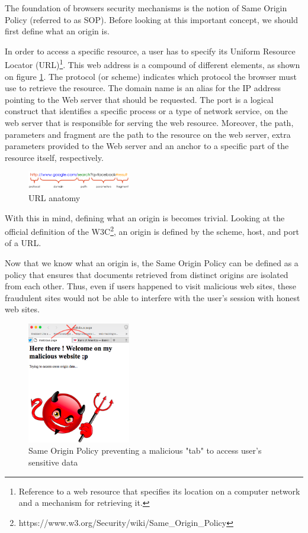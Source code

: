 \documentclass[journal]{IEEEtran}
\begin{document}
The foundation of browsers security mechanisms is the notion of Same Origin Policy (referred to as SOP). Before looking at this important concept, we should first define what an origin is.

\medskip

In order to access a specific resource, a user has to specify its Uniform Resource Locator (URL)\footnote{Reference to a web resource that specifies its location on a computer network and a mechanism for retrieving it.}. This web address is a compound of different elements, as shown on figure \ref{fig:URL}. The protocol (or scheme) indicates which protocol the browser must use to retrieve the resource. The domain name is an alias for the IP address pointing to the Web server that should be requested. The port is a logical construct that identifies a specific process or a type of network service, on the web server that is responsible for serving the web resource. Moreover, the path, parameters and fragment are the path to the resource on the web server, extra parameters provided to the Web server and an anchor to a specific part of the resource itself, respectively.

\begin{figure}[h]
\centering
\includegraphics[width=0.4\textwidth]{images/URL.png}
\caption{URL anatomy}
\label{fig:URL}
\end{figure}

\medskip

With this in mind, defining what an origin is becomes trivial. Looking at the official definition of the W3C\footnote{https://www.w3.org/Security/wiki/Same\_Origin\_Policy}, an origin is defined by the scheme, host, and port of a URL.

\medskip

Now that we know what an origin is, the Same Origin Policy can be defined as a policy that ensures that documents retrieved from distinct origins are isolated from each other. Thus, even if users happened to visit malicious web sites, these fraudulent sites would not be able to interfere with the user's session with honest web sites.

\begin{figure}[h]
\centering
\includegraphics[width=0.4\textwidth]{images/SOPTabs.png}
\caption{Same Origin Policy preventing a malicious "tab" to access user's sensitive data}
\label{fig:SOPTabs}
\end{figure}
\end{document}
